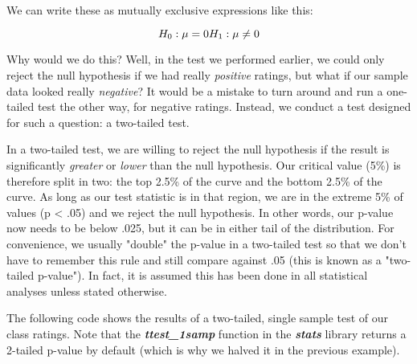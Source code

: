 \documentclass[11pt]{article}
\begin{document}
We can write these as mutually exclusive expressions like this:

\begin{equation}H_{0}: \mu = 0 \\ H_{1}: \mu \neq 0 \end{equation}

Why would we do this? Well, in the test we performed earlier, we could
only reject the null hypothesis if we had really \emph{positive}
ratings, but what if our sample data looked really \emph{negative}? It
would be a mistake to turn around and run a one-tailed test the other
way, for negative ratings. Instead, we conduct a test designed for such
a question: a two-tailed test.

In a two-tailed test, we are willing to reject the null hypothesis if
the result is significantly \emph{greater} or \emph{lower} than the null
hypothesis. Our critical value (5\%) is therefore split in two: the top
2.5\% of the curve and the bottom 2.5\% of the curve. As long as our
test statistic is in that region, we are in the extreme 5\% of values (p
\textless{} .05) and we reject the null hypothesis. In other words, our
p-value now needs to be below .025, but it can be in either tail of the
distribution. For convenience, we usually "double" the p-value in a
two-tailed test so that we don't have to remember this rule and still
compare against .05 (this is known as a "two-tailed p-value"). In fact,
it is assumed this has been done in all statistical analyses unless
stated otherwise.

The following code shows the results of a two-tailed, single sample test
of our class ratings. Note that the \textbf{\emph{ttest\_1samp}}
function in the \textbf{\emph{stats}} library returns a 2-tailed p-value
by default (which is why we halved it in the previous example).
\end{document}
